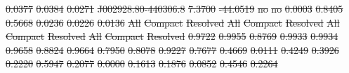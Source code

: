 \documentclass[11pt, a4paper]{book}
\providecommand{\DIFdeltex}[1]{{\protect\color{red}\sout{#1}}}                      %
\providecommand{\DIFdel}[1]{\texorpdfstring{\DIFdeltex{#1}}{}} %
\begin{document}
\DIFdel{0.0377 }%
\DIFdel{0.0384 }%
\DIFdel{0.0271}%
\DIFdel{J002928.80-440306.8 }%
\DIFdel{7.3700 }%
\DIFdel{-44.0519 }%
\DIFdel{no }%
\DIFdel{no }%
\DIFdel{0.0003 }%
\DIFdel{0.8405 }%
\DIFdel{0.5668 }%
\DIFdel{0.0236 }%
\DIFdel{0.0226 }%
\DIFdel{0.0136}%
\DIFdel{All }%
\DIFdel{Compact }%
\DIFdel{Resolved }%
\DIFdel{All }%
\DIFdel{Compact }%
\DIFdel{Resolved }%
\DIFdel{All }%
\DIFdel{Compact }%
\DIFdel{Resolved }%
\DIFdel{All }%
\DIFdel{Compact }%
\DIFdel{Resolved }%
\DIFdel{0.9722 }%
\DIFdel{0.9955 }%
\DIFdel{0.8769 }%
\DIFdel{0.9933 }%
\DIFdel{0.9934 }%
\DIFdel{0.9658 }%
\DIFdel{0.8824 }%
\DIFdel{0.9664 }%
\DIFdel{0.7950 }%
\DIFdel{0.8078 }%
\DIFdel{0.9227 }%
\DIFdel{0.7677 }%
\DIFdel{0.4669 }%
\DIFdel{0.0111 }%
\DIFdel{0.4249 }%
\DIFdel{0.3926 }%
\DIFdel{0.2220 }%
\DIFdel{0.5947 }%
\DIFdel{0.2077 }%
\DIFdel{0.0000 }%
\DIFdel{0.1613 }%
\DIFdel{0.1876 }%
\DIFdel{0.0852 }%
\DIFdel{0.4546 }%
\DIFdel{0.2264 }%
\end{document}
